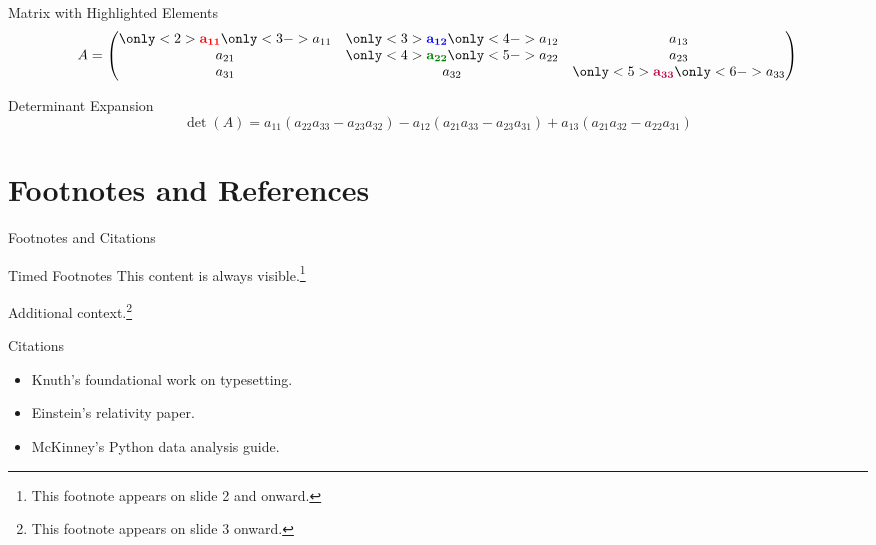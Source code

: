 \documentclass[
  doctype=beamer,
  beameraspectratio=169,
  beamertheme=Madrid,
  institution=generic,
]{omnilatex}
\begin{document}
\begin{frame}{Matrix with Highlighted Elements}
  \[
    A = \begin{pmatrix}
      \only<2>{\color{red}\mathbf{a_{11}}} \only<3->{a_{11}} &
      \only<3>{\color{blue}\mathbf{a_{12}}} \only<4->{a_{12}} &
      a_{13} \\
      a_{21} &
      \only<4>{\color{green!50!black}\mathbf{a_{22}}} \only<5->{a_{22}} &
      a_{23} \\
      a_{31} &
      a_{32} &
      \only<5>{\color{purple}\mathbf{a_{33}}} \only<6->{a_{33}}
    \end{pmatrix}
  \]

  \vspace{1em}
  \begin{block}{Determinant Expansion}
    \[
      \det(A) = a_{11}(a_{22}a_{33} - a_{23}a_{32})
              - a_{12}(a_{21}a_{33} - a_{23}a_{31})
              + a_{13}(a_{21}a_{32} - a_{22}a_{31})
    \]
  \end{block}
\end{frame}

\section{Footnotes and References}

\begin{frame}{Footnotes and Citations}
  \begin{block}{Timed Footnotes}
    This content is always visible.\footnote<2->{This footnote appears on slide 2 and onward.}

    Additional context.\footnote<3->{This footnote appears on slide 3 onward.}
  \end{block}

  \vspace{1em}
  \begin{block}{Citations}
    \begin{itemize}
      \item Knuth's foundational work\cite{knuthTeXbook1986} on typesetting.
      \item Einstein's relativity paper\cite{einstein1905}.
      \item McKinney's Python data analysis guide\cite{mckinneyPythonDataAnalysis2018}.
    \end{itemize}
  \end{block}
\end{frame}
\end{document}
